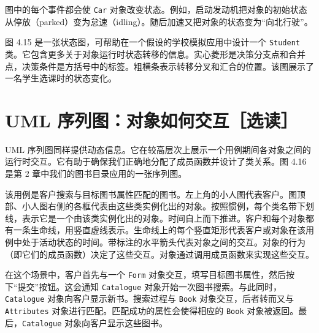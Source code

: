 
图中的每个事件都会使 \texttt{Car} 对象改变状态。例如，启动发动机把对象的初始状态从停放（parked）变为怠速（idling）。随后加速又把对象的状态变为“向北行驶”。

图 4.15 是一张状态图，可帮助在一个假设的学校模拟应用中设计一个 \texttt{Student} 类。它包含更多关于对象运行时状态转移的信息。实心菱形是决策分支点和合并点，决策条件是方括号中的标签。粗横条表示转移分叉和汇合的位置。该图展示了一名学生选课时的状态变化。



\section{UML 序列图：对象如何交互［选读］}

UML 序列图同样提供动态信息。它在较高层次上展示一个用例期间各对象之间的运行时交互。它有助于确保我们正确地分配了成员函数并设计了类关系。图 4.16 是第 2 章中我们的图书目录应用的一张序列图。

该用例是客户搜索与目标图书属性匹配的图书。左上角的小人图代表客户。图顶部、小人图右侧的各框代表由这些类实例化出的对象。按照惯例，每个类名带下划线，表示它是一个由该类实例化出的对象。时间自上而下推进。客户和每个对象都有一条生命线，用竖直虚线表示。生命线上的每个竖直矩形代表客户或对象在该用例中处于活动状态的时间。带标注的水平箭头代表对象之间的交互。对象的行为（即它们的成员函数）决定了这些交互。对象通过调用成员函数来实现这些交互。


在这个场景中，客户首先与一个 \texttt{Form} 对象交互，填写目标图书属性，然后按下“提交”按钮。这会通知 \texttt{Catalogue} 对象开始一次图书搜索。与此同时，\texttt{Catalogue} 对象向客户显示新书。搜索过程与 \texttt{Book} 对象交互，后者转而又与 \texttt{Attributes} 对象进行匹配。匹配成功的属性会使得相应的 \texttt{Book} 对象被返回。最后，\texttt{Catalogue} 对象向客户显示这些图书。

